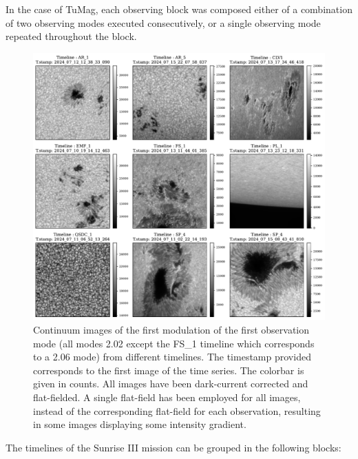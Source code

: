 In the case of TuMag, each observing block was composed either of a combination of two observing modes executed consecutively, or a single observing mode repeated throughout the block.  

\begin{figure}
  \includegraphics[width=\textwidth]{figures/Pipeline/timelines_Examples.pdf}
  \caption[Timelines mosaic.]{
    Continuum images of the first modulation of the first observation mode (all modes 2.02 except the FS\_1 timeline which corresponds to a 2.06 mode) from different timelines. The timestamp provided corresponds to the first image of the time series. The colorbar is given in counts. All images have been dark-current corrected and flat-fielded. A single flat-field has been employed for all images, instead of the corresponding flat-field for each observation, resulting in some images displaying some intensity gradient.} 
    \label{fig_pipeline: timeline_examples}
\end{figure}

The timelines of the Sunrise III mission can be grouped in the following blocks: 

